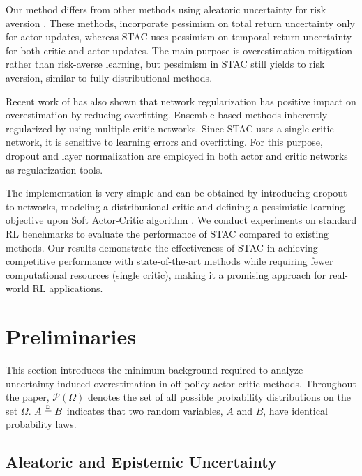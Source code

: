 \documentclass[10pt]{article} %
\newcommand\disteq{\mathrel{\stackrel{\makebox[0pt]{\mbox{\normalfont\tiny D}}}{=}}}
\begin{document}
Our method differs from other methods using aleatoric uncertainty for risk aversion \citet{tang2019worst, yang2021wcsac, kim2022efficient, ma2025dsac}. These methods, incorporate pessimism on total return uncertainty only for actor updates, whereas STAC uses pessimism on temporal return uncertainty for both critic and actor updates. The main purpose is overestimation mitigation rather than risk-averse learning, but pessimism in STAC still yields to risk aversion, similar to fully distributional methods. 

Recent work of \citet{nauman2024overestimation} has also shown that network regularization has positive impact on overestimation by reducing overfitting. Ensemble based methods inherently regularized by using multiple critic networks. Since STAC uses a single critic network, it is sensitive to learning errors and overfitting. For this purpose, dropout \citep{srivastava2014dropout} and layer normalization \citep{ba2016layer} are employed in both actor and critic networks as regularization tools.

The implementation is very simple and can be obtained by introducing dropout to networks, modeling a distributional critic and defining a pessimistic learning objective upon Soft Actor-Critic algorithm \citep{haarnoja2018soft}. We conduct experiments on standard RL benchmarks to evaluate the performance of STAC compared to existing methods. Our results demonstrate the effectiveness of STAC in achieving competitive performance with state-of-the-art methods while requiring fewer computational resources (single critic), making it a promising approach for real-world RL applications. 

\section{Preliminaries}

\label{sec:preliminaries}

This section introduces the minimum background required to analyze uncertainty-induced overestimation in off-policy actor-critic methods. Throughout the paper, $\mathcal{P}(\Omega)$ denotes the set of all possible probability distributions on the set $\Omega$. $A \disteq B $ indicates that two random variables, $A$ and $B$, have identical probability laws. 

\subsection{Aleatoric and Epistemic Uncertainty}
\end{document}
